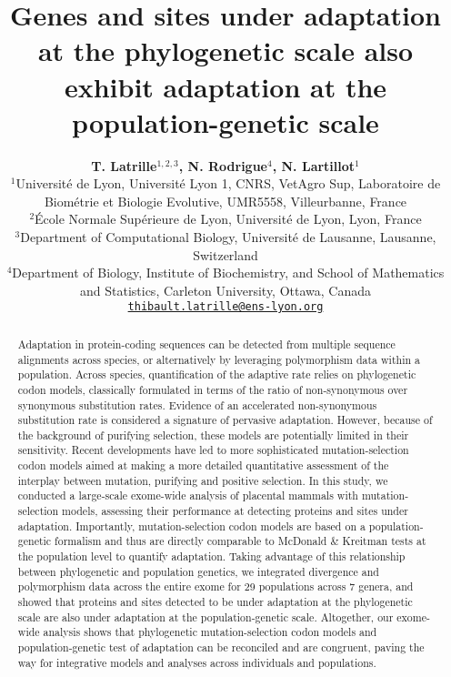\documentclass{article}
\title{Genes and sites under adaptation at the phylogenetic scale also exhibit adaptation at the population-genetic scale}
\author{
    \large
    \textbf{T. {Latrille}$^{1,2,3}$, N. {Rodrigue}$^{4}$, N. {Lartillot}$^{1}$}\\
    \normalsize
    $^{1}$Université de Lyon, Université Lyon 1, CNRS, VetAgro Sup, Laboratoire de Biométrie et Biologie Evolutive, UMR5558, Villeurbanne, France\\
    $^{2}$École Normale Supérieure de Lyon, Université de Lyon, Lyon, France\\
    $^{3}$Department of Computational Biology, Université de Lausanne, Lausanne, Switzerland\\
    $^{4}$Department of Biology, Institute of Biochemistry, and School of Mathematics and Statistics, Carleton University, Ottawa, Canada \\
    \texttt{\href{mailto:thibault.latrille@ens-lyon.org}{thibault.latrille@ens-lyon.org}} \\
}
\begin{document}
    \maketitle

    \begin{abstract}
        Adaptation in protein-coding sequences can be detected from multiple sequence alignments across species, or alternatively by leveraging polymorphism data within a population.
        Across species, quantification of the adaptive rate relies on phylogenetic codon models, classically formulated in terms of the ratio of non-synonymous over synonymous substitution rates.
        Evidence of an accelerated non-synonymous substitution rate is considered a signature of pervasive adaptation.
        However, because of the background of purifying selection, these models are potentially limited in their sensitivity.
        Recent developments have led to more sophisticated mutation-selection codon models aimed at making a more detailed quantitative assessment of the interplay between mutation, purifying and positive selection.
        In this study, we conducted a large-scale exome-wide analysis of placental mammals with mutation-selection models, assessing their performance at detecting proteins and sites under adaptation.
        Importantly, mutation-selection codon models are based on a population-genetic formalism and thus are directly comparable to McDonald \& Kreitman tests at the population level to quantify adaptation.
        Taking advantage of this relationship between phylogenetic and population genetics, we integrated divergence and polymorphism data across the entire exome for 29 populations across 7 genera, and showed that proteins and sites detected to be under adaptation at the phylogenetic scale are also under adaptation at the population-genetic scale.
        Altogether, our exome-wide analysis shows that phylogenetic mutation-selection codon models and population-genetic test of adaptation can be reconciled and are congruent, paving the way for integrative models and analyses across individuals and populations.
    \end{abstract}

\end{document}
